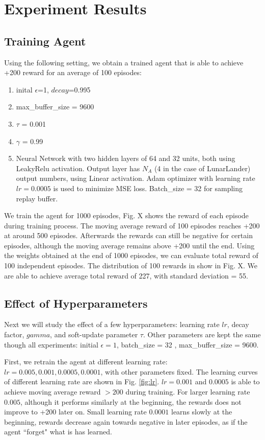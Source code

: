 \documentclass[conference]{IEEEtran}
\begin{document}
\section{Experiment  Results}
\subsection{Training Agent}
Using the following setting, we obtain a trained agent that is able to achieve +200 reward for an average of 100 episodes:
\begin{enumerate}
\item inital $\epsilon$=1, $decay$=0.995
\item max\_buffer\_size = 9600
\item $\tau$ = 0.001
\item $\gamma$ = 0.99
\item Neural Network with two hidden layers of 64 and 32 units, both using LeakyRelu activation. Output layer has $N_A$ (4 in the case of LunarLander) output numbers, using Linear activation. Adam optimizer with learning rate $lr=0.0005$ is used to minimize MSE loss. Batch\_size = 32 for sampling replay buffer.
\end{enumerate}
We train the agent for 1000 episodes, Fig. X shows the reward of each episode during training process. The moving average reward of 100 episodes reaches +200 at around 500 episodes. Afterwards the rewards can still be negative for certain episodes, although the moving average remains above +200 until the end. Using the weights obtained at the end of 1000 episodes, we can evaluate total reward of 100 independent episodes. The distribution of 100 rewards in show in Fig. X. We are able to achieve average total reward of 227, with standard deviation = 55.

\subsection{Effect of Hyperparameters}
Next we will study the effect of a few hyperparameters: learning rate $lr$, decay factor, $gamma$, and soft-update parameter $\tau$. Other parameters are kept the same though all experiments: initial $\epsilon=1$, batch\_size = 32 , max\_buffer\_size = 9600.

First, we retrain the agent at different learning rate: $lr = 0.005, 0.001, 0.0005, 0.0001$, with other parameters fixed. The learning curves of different learning rate are shown in Fig. \ref{fig:lr}. $lr = 0.001$ and $0.0005$ is able to achieve moving average reward $>200$ during training. For larger learning rate $0.005$, although it performs similarly at the beginning, the rewards does not improve to +200 later on. Small learning rate $0.0001$ learns slowly at the beginning, rewards decrease again towards negative in later episodes, as if the agent ``forget" what is has learned. 
\end{document}
